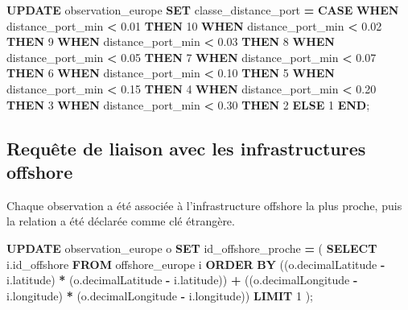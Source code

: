 \documentclass[mstat,12pt]{unswthesis}
\newenvironment{Shaded}{\begin{snugshade}}{\end{snugshade}}
\newcommand{\ControlFlowTok}[1]{\textcolor[rgb]{0.13,0.29,0.53}{\textbf{#1}}}
\newcommand{\DecValTok}[1]{\textcolor[rgb]{0.00,0.00,0.81}{#1}}
\newcommand{\FloatTok}[1]{\textcolor[rgb]{0.00,0.00,0.81}{#1}}
\newcommand{\KeywordTok}[1]{\textcolor[rgb]{0.13,0.29,0.53}{\textbf{#1}}}
\newcommand{\NormalTok}[1]{#1}
\newcommand{\OperatorTok}[1]{\textcolor[rgb]{0.81,0.36,0.00}{\textbf{#1}}}
\begin{document}
\begin{Shaded}
\begin{Highlighting}[]
\KeywordTok{UPDATE}\NormalTok{ observation\_europe}
\KeywordTok{SET}\NormalTok{ classe\_distance\_port }\OperatorTok{=}
    \ControlFlowTok{CASE}
        \ControlFlowTok{WHEN}\NormalTok{ distance\_port\_min }\OperatorTok{\textless{}} \FloatTok{0.01} \ControlFlowTok{THEN} \DecValTok{10}
        \ControlFlowTok{WHEN}\NormalTok{ distance\_port\_min }\OperatorTok{\textless{}} \FloatTok{0.02} \ControlFlowTok{THEN} \DecValTok{9}
        \ControlFlowTok{WHEN}\NormalTok{ distance\_port\_min }\OperatorTok{\textless{}} \FloatTok{0.03} \ControlFlowTok{THEN} \DecValTok{8}
        \ControlFlowTok{WHEN}\NormalTok{ distance\_port\_min }\OperatorTok{\textless{}} \FloatTok{0.05} \ControlFlowTok{THEN} \DecValTok{7}
        \ControlFlowTok{WHEN}\NormalTok{ distance\_port\_min }\OperatorTok{\textless{}} \FloatTok{0.07} \ControlFlowTok{THEN} \DecValTok{6}
        \ControlFlowTok{WHEN}\NormalTok{ distance\_port\_min }\OperatorTok{\textless{}} \FloatTok{0.10} \ControlFlowTok{THEN} \DecValTok{5}
        \ControlFlowTok{WHEN}\NormalTok{ distance\_port\_min }\OperatorTok{\textless{}} \FloatTok{0.15} \ControlFlowTok{THEN} \DecValTok{4}
        \ControlFlowTok{WHEN}\NormalTok{ distance\_port\_min }\OperatorTok{\textless{}} \FloatTok{0.20} \ControlFlowTok{THEN} \DecValTok{3}
        \ControlFlowTok{WHEN}\NormalTok{ distance\_port\_min }\OperatorTok{\textless{}} \FloatTok{0.30} \ControlFlowTok{THEN} \DecValTok{2}
        \ControlFlowTok{ELSE} \DecValTok{1}
    \ControlFlowTok{END}\NormalTok{;}
\end{Highlighting}
\end{Shaded}

\subsection{Requête de liaison avec les infrastructures
offshore}\label{requuxeate-de-liaison-avec-les-infrastructures-offshore}

Chaque observation a été associée à l'infrastructure offshore la plus
proche, puis la relation a été déclarée comme clé étrangère.

\begin{Shaded}
\begin{Highlighting}[]
\KeywordTok{UPDATE}\NormalTok{ observation\_europe o}
\KeywordTok{SET}\NormalTok{ id\_offshore\_proche }\OperatorTok{=}\NormalTok{ (}
    \KeywordTok{SELECT}\NormalTok{ i.id\_offshore}
    \KeywordTok{FROM}\NormalTok{ offshore\_europe i}
    \KeywordTok{ORDER} \KeywordTok{BY}
\NormalTok{        ((o.decimalLatitude }\OperatorTok{{-}}\NormalTok{ i.latitude) }\OperatorTok{*}\NormalTok{ (o.decimalLatitude }\OperatorTok{{-}}\NormalTok{ i.latitude)) }\OperatorTok{+}
\NormalTok{        ((o.decimalLongitude }\OperatorTok{{-}}\NormalTok{ i.longitude) }\OperatorTok{*}\NormalTok{ (o.decimalLongitude }\OperatorTok{{-}}\NormalTok{ i.longitude))}
    \KeywordTok{LIMIT} \DecValTok{1}
\NormalTok{);}
\end{Highlighting}
\end{Shaded}
\end{document}
